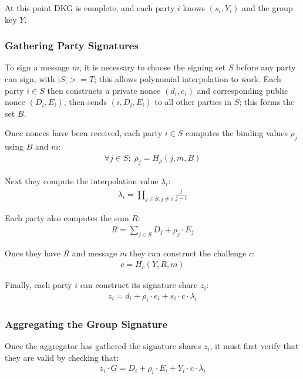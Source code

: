 \documentclass{article}
\theoremstyle{plain}
\theoremstyle{definition}
\theoremstyle{remark}
\begin{document}
At this point DKG is complete, and each party $i$ knows $(s_i, Y_i)$ and the group key $Y$.

\subsubsection{
  Gathering Party Signatures
}

To sign a message $m$, it is necessary to choose the signing set $S$ before any party can sign, with $|S| >= T$; this allows polynomial interpolation to work.  Each party $i \in S$ then constructs a private nonce $(d_i,e_i)$ and corresponding public nonce $(D_i,E_i)$, then sends $(i, D_i, E_i)$ to all other parties in $S$; this forms the set $B$.

Once nonces have been received, each party $i \in S$ computes the binding values $\rho_j$ using $B$ and $m$:
\begin{align}\label{equation:frost-rho}
  \forall j \in S;\;\rho_j = H_\rho(j, m, B)
\end{align}

Next they compute the interpolation value $\lambda_i$:
\begin{align}\label{equation:frost-lambda}
  \lambda_i = \prod_{j \in S; j \neq i}^{} \frac{j}{j - i}
\end{align}

Each party also computes the sum $R$:
\begin{align}\label{equation:frost-R}
  R = \sum_{j \in S}^{} D_j + \rho_j \cdot E_j
\end{align}

Once they have $R$ and message $m$ they can construct the challenge $c$:
\begin{align}\label{equation:frost-c}
  c = H_c(Y, R, m)
\end{align}

Finally, each party $i$ can construct its signature share $z_i$:
\begin{align}\label{equation:frost-z}
  z_i = d_i + \rho_i \cdot e_i + s_i \cdot c \cdot \lambda_i
\end{align}


\subsubsection{
  Aggregating the Group Signature
}

Once the aggregator has gathered the signature shares $z_i$, it must first verify that they are valid by checking that:
\begin{align}\label{equation:frost-share-check}
  z_i \cdot G = D_i + \rho_i \cdot E_i + Y_i \cdot c \cdot \lambda_i
\end{align}
\end{document}
